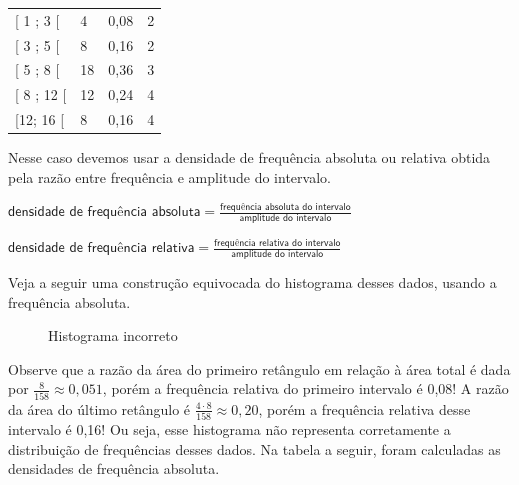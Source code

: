 \begin{savenotes}\sphinxattablestart
\centering
\begin{tabulary}{\linewidth}[t]{|T|T|T|T|}
\hline
{}\relax &\relax &\relax &\relax \\
\hline
{[} 1 ; 3 {[}
&
4
&
0,08
&
2
\\
\hline
{[} 3 ; 5 {[}
&
8
&
0,16
&
2
\\
\hline
{[} 5 ; 8 {[}
&
18
&
0,36
&
3
\\
\hline
{[} 8 ; 12 {[}
&
12
&
0,24
&
4
\\
\hline
{[}12; 16 {[}
&
8
&
0,16
&
4
\\
\hline
\end{tabulary}
\par
\sphinxattableend\end{savenotes}

Nesse caso devemos usar a densidade de frequência absoluta ou relativa obtida pela razão entre frequência e amplitude do intervalo.

\(\textsf{densidade de frequência absoluta}=\frac{\textsf{frequência absoluta do intervalo}}{\textsf{amplitude do intervalo}}\)

\(\textsf{densidade de frequência relativa}=\frac{\textsf{frequência relativa do intervalo}}{\textsf{amplitude do intervalo}}\)

Veja a seguir uma construção equivocada do histograma desses dados, usando a frequência absoluta.

\begin{figure}[H]
\centering
\capstart

\noindent{}
\caption{Histograma incorreto}\label{\detokenize{PE103-4:fig-coloque-aqui-o-nome}}\label{\detokenize{PE103-4:id8}}\end{figure}

Observe que a razão da área do primeiro retângulo em relação à área total é dada por \(\displaystyle{\frac{8}{158}}\approx  0,051\), porém a frequência relativa do primeiro intervalo é 0,08! A razão da área do último retângulo é \(\displaystyle{\frac{4\cdot 8}{158}}\approx 0,20\), porém a frequência relativa desse intervalo é 0,16! Ou seja, esse histograma não representa corretamente a distribuição de frequências desses dados. Na tabela a seguir, foram calculadas as densidades de frequência absoluta.


